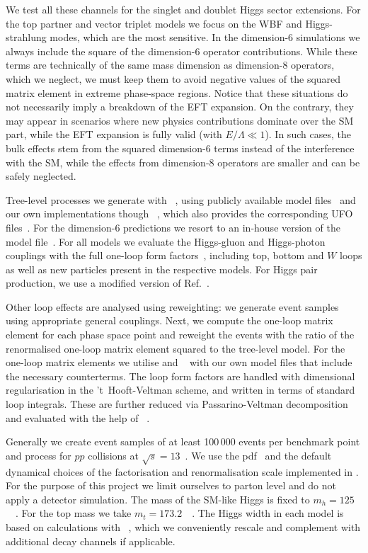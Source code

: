 We test all these channels for the singlet and doublet Higgs sector
extensions. For the top partner and vector triplet models we focus on
the WBF and Higgs-strahlung modes, which are the most sensitive.  In
the dimension-6 simulations we always include the square of the
dimension-6 operator contributions. While these terms are technically
of the same mass dimension as dimension-8 operators, which we neglect,
we must keep them to avoid negative values of the squared matrix
element in extreme phase-space regions. Notice that these situations
do not necessarily imply a breakdown of the EFT expansion. On the
contrary, they may appear in scenarios where new physics contributions
dominate over the SM part, while the EFT expansion is fully valid
(with $E/\Lambda \ll 1$). In such cases, the bulk effects stem from
the squared dimension-6 terms instead of the interference with the SM,
while the effects from dimension-8 operators are smaller and can be
safely neglected.  

Tree-level processes we generate with
~\cite{Alwall:2014hca}, using publicly available
model files~\cite{feynrules-site} and our own implementations though
~\cite{Alloul:2013bka}, which also provides the
corresponding UFO files~\cite{Degrande:2011ua}.  For the dimension-6
predictions we resort to an in-house version of the 
model file~\cite{Alloul:2013naa}.  For all models we evaluate the
Higgs-gluon and Higgs-photon couplings with the full one-loop form
factors~\cite{ggh-analytical}, including top, bottom and $W$ loops as
well as new particles present in the respective models. For Higgs pair
production, we use a modified version of Ref.~\cite{higgspair-ucl}.

Other loop effects are analysed using reweighting: we generate event
samples using appropriate general couplings. Next, we compute the
one-loop matrix element for each phase space point and reweight the
events with the ratio of the renormalised one-loop matrix element
squared to the tree-level model. For the one-loop matrix elements we
utilise  and ~\cite{Hahn:2000kx}
with our own model files that include the necessary counterterms. The
loop form factors are handled with dimensional regularisation in the
't~Hooft-Veltman scheme, and written in terms of standard loop
integrals. These are further reduced via Passarino-Veltman
decomposition and evaluated with the help of
~\cite{Hahn:1998yk}.

Generally we create event samples of at least 100\,000 events per
benchmark point and process for $pp$ collisions at $\sqrt{s} =
13$~\tev. We use the  pdf~\cite{CTEQ6L} and the
default dynamical choices of the factorisation and renormalisation
scale implemented in . For the purpose of this
project we limit ourselves to parton level and do not apply a detector
simulation.  The mass of the SM-like Higgs is fixed to $m_h =
125$~\gev~\cite{higgsmass}. For the top mass we take $m_t =
173.2$~\gev~\cite{topmass}. The Higgs width in each model is based on
calculations with ~\cite{hdecay}, which we
conveniently rescale and complement with additional decay channels if
applicable.



